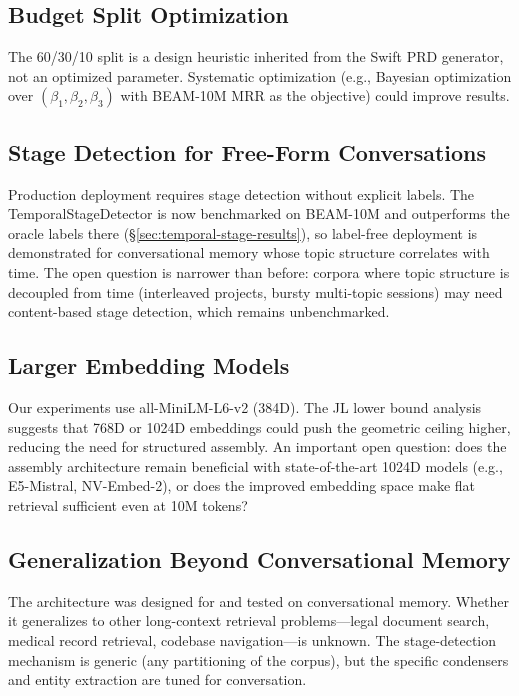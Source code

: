 \documentclass[11pt]{article}
\newcommand{\eg}{e.g.}
\begin{document}
\subsection{Budget Split Optimization}

The 60/30/10 split is a design heuristic inherited from the Swift PRD
generator, not an optimized parameter.  Systematic optimization (\eg,
Bayesian optimization over $(\beta_1, \beta_2, \beta_3)$ with
BEAM-10M MRR as the objective) could improve results.

\subsection{Stage Detection for Free-Form Conversations}
\label{sec:stage-detection-deployment}

Production deployment requires stage detection without explicit
labels.  The TemporalStageDetector is now benchmarked on BEAM-10M
and outperforms the oracle labels there
(\S\ref{sec:temporal-stage-results}), so label-free deployment is
demonstrated for conversational memory whose topic structure
correlates with time.  The open question is narrower than before:
corpora where topic structure is decoupled from time (interleaved
projects, bursty multi-topic sessions) may need content-based stage
detection, which remains unbenchmarked.

\subsection{Larger Embedding Models}

Our experiments use all-MiniLM-L6-v2 (384D).  The JL lower bound
analysis suggests that 768D or 1024D embeddings could push the
geometric ceiling higher, reducing the need for structured assembly.
An important open question: does the assembly architecture remain
beneficial with state-of-the-art 1024D models (\eg, E5-Mistral,
NV-Embed-2), or does the improved embedding space make flat retrieval
sufficient even at 10M tokens?

\subsection{Generalization Beyond Conversational Memory}

The architecture was designed for and tested on conversational memory.
Whether it generalizes to other long-context retrieval
problems---legal document search, medical record retrieval, codebase
navigation---is unknown.  The stage-detection mechanism is generic
(any partitioning of the corpus), but the specific condensers and
entity extraction are tuned for conversation.
\end{document}
